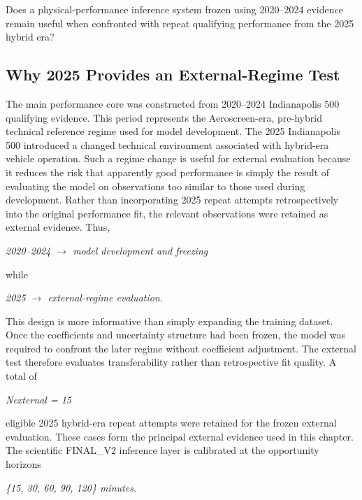 Does a physical-performance inference system frozen using 2020--2024 evidence remain useful when confronted with repeat qualifying performance from the 2025 hybrid era?

\subsection{Why 2025 Provides an External-Regime Test}
The main performance core was constructed from 2020--2024 Indianapolis 500 qualifying evidence. This period represents the Aeroscreen-era, pre-hybrid technical reference regime used for model development. The 2025 Indianapolis 500 introduced a changed technical environment associated with hybrid-era vehicle operation. Such a regime change is useful for external evaluation because it reduces the risk that apparently good performance is simply the result of evaluating the model on observations too similar to those used during development. Rather than incorporating 2025 repeat attempts retrospectively into the original performance fit, the relevant observations were retained as external evidence. Thus,

\begin{center}\textit{2020--2024 \ensuremath{\rightarrow} model development and freezing}\end{center}

while

\begin{center}\textit{2025 \ensuremath{\rightarrow} external-regime evaluation.}\end{center}

This design is more informative than simply expanding the training dataset. Once the coefficients and uncertainty structure had been frozen, the model was required to confront the later regime without coefficient adjustment. The external test therefore evaluates transferability rather than retrospective fit quality. A total of

\begin{center}\textit{Nexternal = 15}\end{center}

eligible 2025 hybrid-era repeat attempts were retained for the frozen external evaluation. These cases form the principal external evidence used in this chapter. The scientific FINAL\_V2 inference layer is calibrated at the opportunity horizons

\begin{center}\textit{\{15, 30, 60, 90, 120\} minutes.}\end{center}

